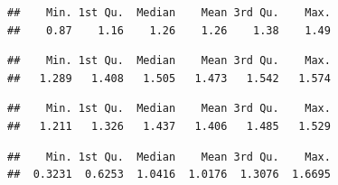 \documentclass[
  10pt,
  b5paper,
  oneside]{book}
\newenvironment{Shaded}{\begin{snugshade}}{\end{snugshade}}
\newcommand{\CommentTok}[1]{\textcolor[rgb]{0.56,0.35,0.01}{\textit{#1}}}
\newcommand{\DocumentationTok}[1]{\textcolor[rgb]{0.56,0.35,0.01}{\textbf{\textit{#1}}}}
\newcommand{\FunctionTok}[1]{\textcolor[rgb]{0.00,0.00,0.00}{#1}}
\newcommand{\NormalTok}[1]{#1}
\newcommand{\SpecialCharTok}[1]{\textcolor[rgb]{0.00,0.00,0.00}{#1}}
\begin{document}
\begin{Shaded}
\end{Shaded}

\begin{verbatim}
##    Min. 1st Qu.  Median    Mean 3rd Qu.    Max. 
##    0.87    1.16    1.26    1.26    1.38    1.49
\end{verbatim}

\begin{Shaded}
\end{Shaded}

\begin{verbatim}
##    Min. 1st Qu.  Median    Mean 3rd Qu.    Max. 
##   1.289   1.408   1.505   1.473   1.542   1.574
\end{verbatim}

\begin{Shaded}
\end{Shaded}

\begin{verbatim}
##    Min. 1st Qu.  Median    Mean 3rd Qu.    Max. 
##   1.211   1.326   1.437   1.406   1.485   1.529
\end{verbatim}

\begin{Shaded}
\end{Shaded}

\begin{verbatim}
##    Min. 1st Qu.  Median    Mean 3rd Qu.    Max. 
##  0.3231  0.6253  1.0416  1.0176  1.3076  1.6695
\end{verbatim}
\end{document}
